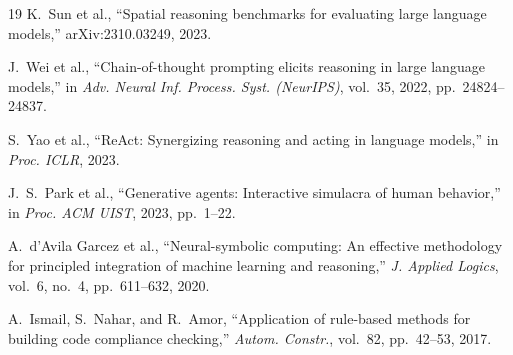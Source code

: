 \documentclass[journal]{IEEEtran}
\begin{document}
\begin{thebibliography}{19}
K.~Sun et al.,
``Spatial reasoning benchmarks for evaluating large language models,''
arXiv:2310.03249, 2023.

J.~Wei et al.,
``Chain-of-thought prompting elicits reasoning in large language models,''
in \textit{Adv. Neural Inf. Process. Syst. (NeurIPS)},
vol.~35, 2022, pp.~24824--24837.

S.~Yao et al.,
``ReAct: Synergizing reasoning and acting in language models,''
in \textit{Proc. ICLR}, 2023.

J.~S.~Park et al.,
``Generative agents: Interactive simulacra of human behavior,''
in \textit{Proc. ACM UIST}, 2023, pp.~1--22.

A.~d'Avila Garcez et al.,
``Neural-symbolic computing: An effective methodology for principled
integration of machine learning and reasoning,''
\textit{J. Applied Logics}, vol.~6, no.~4, pp.~611--632, 2020.

A.~Ismail, S.~Nahar, and R.~Amor,
``Application of rule-based methods for building code compliance checking,''
\textit{Autom. Constr.}, vol.~82, pp.~42--53, 2017.

\end{thebibliography}
\end{document}
